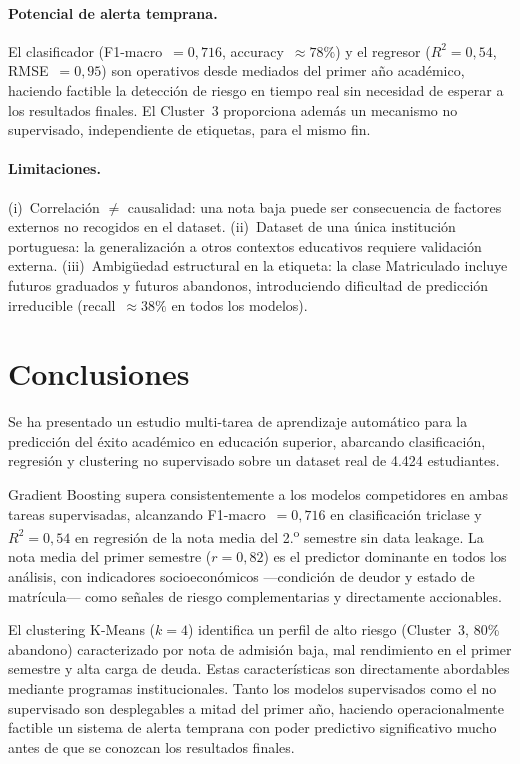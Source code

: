 \documentclass{article}
\begin{document}
\paragraph{Potencial de alerta temprana.} El clasificador (F1-macro~$=0{,}716$, accuracy~$\approx78\%$) y el regresor ($R^2=0{,}54$, RMSE~$=0{,}95$) son operativos desde mediados del primer a\~no acad\'emico, haciendo factible la detecci\'on de riesgo en tiempo real sin necesidad de esperar a los resultados finales. El Cluster~3 proporciona adem\'as un mecanismo no supervisado, independiente de etiquetas, para el mismo fin.

\paragraph{Limitaciones.} (i)~Correlaci\'on $\neq$ causalidad: una nota baja puede ser consecuencia de factores externos no recogidos en el dataset. (ii)~Dataset de una \'unica instituci\'on portuguesa: la generalizaci\'on a otros contextos educativos requiere validaci\'on externa. (iii)~Ambig\"uedad estructural en la etiqueta: la clase Matriculado incluye futuros graduados y futuros abandonos, introduciendo dificultad de predicci\'on irreducible (recall~$\approx38\%$ en todos los modelos).

\section{Conclusiones}

Se ha presentado un estudio multi-tarea de aprendizaje autom\'atico para la predicci\'on del \'exito acad\'emico en educaci\'on superior, abarcando clasificaci\'on, regresi\'on y clustering no supervisado sobre un dataset real de 4.424 estudiantes.

Gradient Boosting supera consistentemente a los modelos competidores en ambas tareas supervisadas, alcanzando F1-macro~$=0{,}716$ en clasificaci\'on triclase y $R^2=0{,}54$ en regresi\'on de la nota media del 2.\textsuperscript{o} semestre sin data leakage. La nota media del primer semestre ($r=0{,}82$) es el predictor dominante en todos los an\'alisis, con indicadores socioecon\'omicos ---condici\'on de deudor y estado de matr\'icula--- como se\~nales de riesgo complementarias y directamente accionables.

El clustering K-Means ($k=4$) identifica un perfil de alto riesgo (Cluster~3, 80\% abandono) caracterizado por nota de admisi\'on baja, mal rendimiento en el primer semestre y alta carga de deuda. Estas caracter\'isticas son directamente abordables mediante programas institucionales. Tanto los modelos supervisados como el no supervisado son desplegables a mitad del primer a\~no, haciendo operacionalmente factible un sistema de alerta temprana con poder predictivo significativo mucho antes de que se conozcan los resultados finales.
\end{document}

